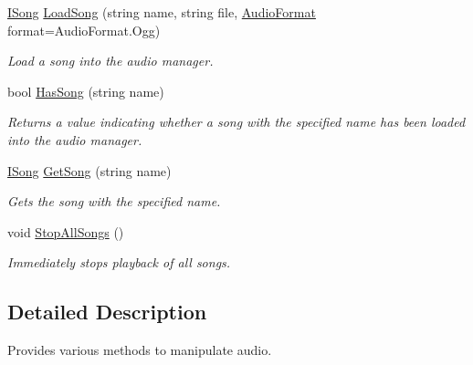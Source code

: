 \begin{DoxyCompactItemize}
\hyperlink{interface_tri_devs_1_1_tri_engine_1_1_audio_1_1_i_song}{I\-Song} \hyperlink{interface_tri_devs_1_1_tri_engine_1_1_audio_1_1_i_audio_manager_a1352f516b9ec1b9cd322c157d0dd3cfe}{Load\-Song} (string name, string file, \hyperlink{namespace_tri_devs_1_1_tri_engine_1_1_audio_a3e1817498a8306afd084903a967537ef}{Audio\-Format} format=Audio\-Format.\-Ogg)
\begin{DoxyCompactList}\small\item\em Load a song into the audio manager. \end{DoxyCompactList}\item 
bool \hyperlink{interface_tri_devs_1_1_tri_engine_1_1_audio_1_1_i_audio_manager_a2def1ff0941badf7d95bf49e7fa2261a}{Has\-Song} (string name)
\begin{DoxyCompactList}\small\item\em Returns a value indicating whether a song with the specified name has been loaded into the audio manager. \end{DoxyCompactList}\item 
\hyperlink{interface_tri_devs_1_1_tri_engine_1_1_audio_1_1_i_song}{I\-Song} \hyperlink{interface_tri_devs_1_1_tri_engine_1_1_audio_1_1_i_audio_manager_a0265b18425d1921c7efb4d12ec7eccb3}{Get\-Song} (string name)
\begin{DoxyCompactList}\small\item\em Gets the song with the specified name. \end{DoxyCompactList}\item 
void \hyperlink{interface_tri_devs_1_1_tri_engine_1_1_audio_1_1_i_audio_manager_a6f055c96d246f8122c7935dfbeb66cc0}{Stop\-All\-Songs} ()
\begin{DoxyCompactList}\small\item\em Immediately stops playback of all songs. \end{DoxyCompactList}\end{DoxyCompactItemize}


\subsection{Detailed Description}
Provides various methods to manipulate audio. 



